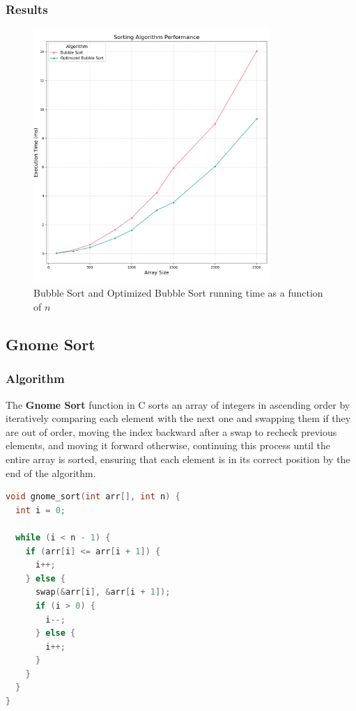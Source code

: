 \documentclass{article}
\begin{document}
\subsubsection{Results}
\begin{figure}[H]
	\includegraphics[width=0.8\textwidth]{images/bubble_sort_comparaison.png}
	\caption{Bubble Sort and Optimized Bubble Sort running time as a function of $n$}
\end{figure}


\subsection{Gnome Sort}

\subsubsection{Algorithm}
The \textbf{Gnome Sort} function in C sorts an array of integers in ascending order by iteratively comparing each element with the next one and swapping them if they are out of order, moving the index backward after a swap to recheck previous elements, and moving it forward otherwise, continuing this process until the entire array is sorted, ensuring that each element is in its correct position by the end of the algorithm.

\begin{lstlisting}[language=C, caption=Gnome Sort implementation]
void gnome_sort(int arr[], int n) {
  int i = 0;

  while (i < n - 1) {
    if (arr[i] <= arr[i + 1]) {
      i++;
    } else {
      swap(&arr[i], &arr[i + 1]);
      if (i > 0) {
        i--;
      } else {
        i++;
      }
    }
  }
}
\end{lstlisting}
\end{document}
